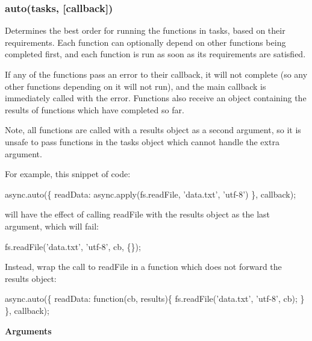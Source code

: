 \label{_auto}%
 \subsubsection*{auto(tasks, \mbox{[}callback\mbox{]})}

Determines the best order for running the functions in {\ttfamily tasks}, based on their requirements. Each function can optionally depend on other functions being completed first, and each function is run as soon as its requirements are satisfied.

If any of the functions pass an error to their callback, it will not complete (so any other functions depending on it will not run), and the main {\ttfamily callback} is immediately called with the error. Functions also receive an object containing the results of functions which have completed so far.

Note, all functions are called with a {\ttfamily results} object as a second argument, so it is unsafe to pass functions in the {\ttfamily tasks} object which cannot handle the extra argument.

For example, this snippet of code\+:


\begin{DoxyCode}
async.auto(\{
  readData: async.apply(fs.readFile, \textcolor{stringliteral}{'data.txt'}, \textcolor{stringliteral}{'utf-8'})
\}, callback);
\end{DoxyCode}


will have the effect of calling {\ttfamily read\+File} with the results object as the last argument, which will fail\+:


\begin{DoxyCode}
fs.readFile(\textcolor{stringliteral}{'data.txt'}, \textcolor{stringliteral}{'utf-8'}, cb, \{\});
\end{DoxyCode}


Instead, wrap the call to {\ttfamily read\+File} in a function which does not forward the {\ttfamily results} object\+:


\begin{DoxyCode}
async.auto(\{
  readData: \textcolor{keyword}{function}(cb, results)\{
    fs.readFile(\textcolor{stringliteral}{'data.txt'}, \textcolor{stringliteral}{'utf-8'}, cb);
  \}
\}, callback);
\end{DoxyCode}


{\bfseries Arguments}


